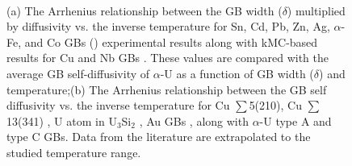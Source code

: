 \documentclass[review]{elsarticle}
\begin{document}
\begin{figure}[h!]
\centering
{}
\\
\caption{(a) The Arrhenius relationship between the GB width ($\delta$) multiplied by diffusivity vs. the inverse temperature for Sn, Cd, Pb, Zn, Ag, $\alpha$-Fe, and Co GBs (\cite{diffusion_compare}) experimental results along with kMC-based results for Cu and Nb GBs \cite{cu_nb}. These values are compared with the average GB self-diffusivity of $\alpha$-U as a function of GB width ($\delta$) and temperature;(b) The Arrhenius relationship between the GB self diffusivity vs. the inverse temperature for Cu $\sum$5(210), Cu $\sum$13(341) \cite{Suzuki2003}, U atom in U$_\mathrm{3}$Si$_\mathrm{2}$ \cite{COOPER2021153129}, Au GBs \cite{diffusion_compare}, along with $\alpha$-U type A and type C GBs. Data from the literature are extrapolated to the studied temperature range.}
\label{fig:diff_comp}
\end{figure}
\end{document}
